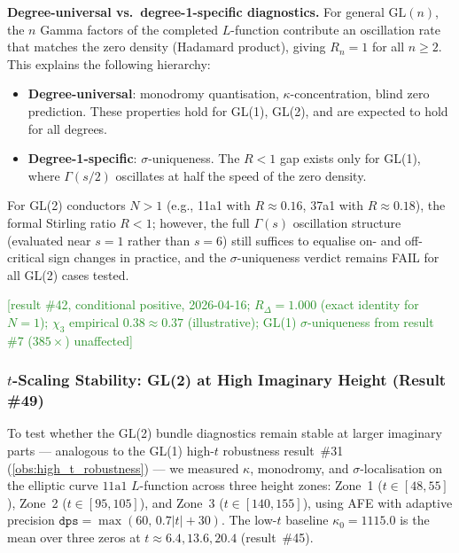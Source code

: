 \documentclass[11pt, a4paper]{article}
\theoremstyle{definition}
\theoremstyle{plain}
\begin{document}
\medskip\noindent
\textbf{Degree-universal vs.\ degree-1-specific diagnostics.}
For general $\mathrm{GL}(n)$, the $n$ Gamma factors of the completed
$L$-function contribute an oscillation rate that matches the zero density
(Hadamard product), giving $R_n = 1$ for all $n \geq 2$.
This explains the following hierarchy:
\begin{itemize}
  \item \textbf{Degree-universal}: monodromy quantisation,
        $\kappa$-concentration, blind zero prediction.  These properties
        hold for GL(1), GL(2), and are expected to hold for all degrees.
  \item \textbf{Degree-1-specific}: $\sigma$-uniqueness.
        The $R < 1$ gap exists only for GL(1), where $\Gamma(s/2)$
        oscillates at half the speed of the zero density.
\end{itemize}
For GL(2) conductors $N > 1$ (e.g., 11a1 with $R \approx 0.16$, 37a1
with $R \approx 0.18$), the formal Stirling ratio $R < 1$; however, the
full $\Gamma(s)$ oscillation structure (evaluated near $s = 1$ rather than
$s = 6$) still suffices to equalise on- and off-critical sign changes in
practice, and the $\sigma$-uniqueness verdict remains FAIL for all GL(2)
cases tested.

\textcolor{ForestGreen}{[result \#42, conditional positive, 2026-04-16;
$R_\Delta = 1.000$ (exact identity for $N=1$);
$\chi_3$ empirical $0.38 \approx 0.37$ (illustrative);
GL(1) $\sigma$-uniqueness from result \#7 ($385\times$) unaffected]}

\subsubsection{$t$-Scaling Stability: GL(2) at High Imaginary Height (Result \#49)}
\label{sec:gl2_high_t}

To test whether the GL(2) bundle diagnostics remain stable at larger imaginary
parts --- analogous to the GL(1) high-$t$ robustness result~\#31
(\cref{obs:high_t_robustness}) --- we measured $\kappa$, monodromy, and
$\sigma$-localisation on the elliptic curve $11\text{a}1$ $L$-function
across three height zones: Zone~1 ($t\in[48,55]$), Zone~2 ($t\in[95,105]$),
and Zone~3 ($t\in[140,155]$), using AFE with adaptive precision
$\texttt{dps}=\max(60,\,0.7|t|+30)$.
The low-$t$ baseline $\kappa_0 = 1115.0$ is the mean over three zeros
at $t\approx 6.4, 13.6, 20.4$ (result~\#45).
\end{document}
